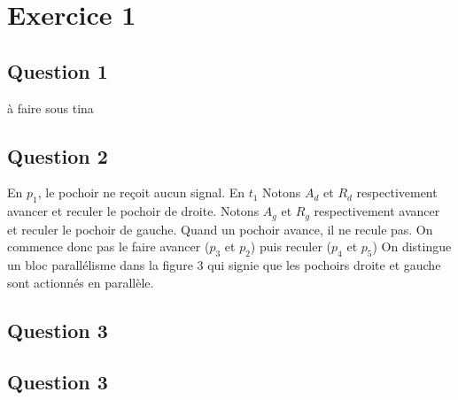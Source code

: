 \section{Exercice 1}
\subsection{Question 1}
à faire sous tina
\subsection{Question 2}
En $p_1$, le pochoir ne reçoit aucun signal.
En $t_1$
Notons $A_d$ et $R_d$ respectivement avancer et reculer le pochoir de
droite.
Notons $A_g$ et $R_g$ respectivement avancer et reculer le pochoir de gauche.
Quand un pochoir avance, il ne recule pas.
On commence donc pas le faire avancer ($p_3$ et $p_2$) puis reculer ($p_4$ et $p_5$)
On distingue un bloc parallélisme dans la figure 3 qui signie que les
pochoirs droite et gauche sont actionnés en parallèle.

\subsection{Question 3}

\subsection{Question 3}
